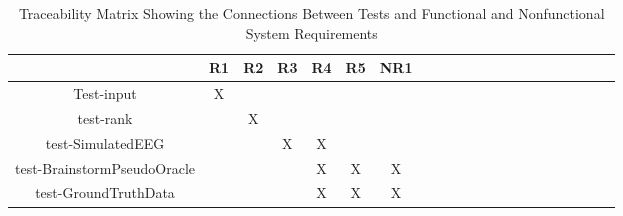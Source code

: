 \documentclass[12pt, titlepage]{article}
\begin{document}
\begin{table}[h!]
	\centering
	\begin{tabular}{|c|c|c|c|c|c|c|c|c|c|c|c|c|c|c|c|c|c|c|c|c|}
		\hline        
		& R1 & R2 & R3 & R4 & R5 & NR1 \\
		\hline
		Test-input        &X & & & & & \\ \hline
		test-rank        & &X & & & &  \\ \hline
		test-SimulatedEEG        & & &X & X& & \\ \hline
		test-BrainstormPseudoOracle        & & & &X & X& X \\ \hline
		test-GroundTruthData        & & & &X & X& X \\ \hline

	\end{tabular}
\caption{Traceability Matrix Showing the Connections Between Tests and Functional and Nonfunctional System Requirements}
\label{Table:A_trace}
\end{table}
				




%
%
%
%
%
%
\end{document}
